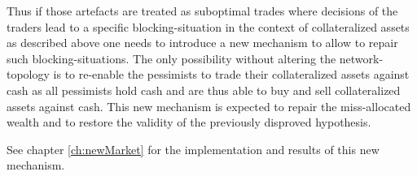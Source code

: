 \documentclass[Bachelorarbeit.tex]{subfiles}
\begin{document}
\medskip 

Thus if those artefacts are treated as suboptimal trades where decisions of the traders lead to a specific blocking-situation in the context of collateralized assets as described above one needs to introduce a new mechanism to allow to repair such blocking-situations. The only possibility without altering the network-topology is to re-enable the pessimists to trade their collateralized assets against cash as all pessimists hold cash and are thus able to buy and sell collateralized assets against cash. This new mechanism is expected to repair the miss-allocated wealth and to restore the validity of the previously disproved hypothesis.

\medskip 

See chapter \ref{ch:newMarket} for the implementation and results of this new mechanism.
\end{document}

